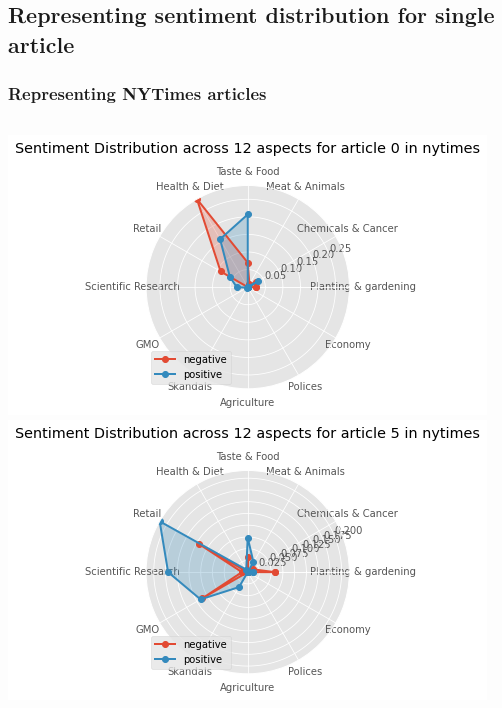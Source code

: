 \documentclass{tum-presentation}
\begin{document}
\subsection{Representing sentiment distribution for single article}
\begin{frame}
  \frametitle{Representing NYTimes articles}
  \begin{columns}[t]
    \centering
    \includegraphics[width = \textwidth]{figures/radar_nytimes_0.png}\\
    \centering
    \includegraphics[width = \textwidth]{figures/radar_nytimes_5.png}
    \end{columns}
\end{frame}
\end{document}
